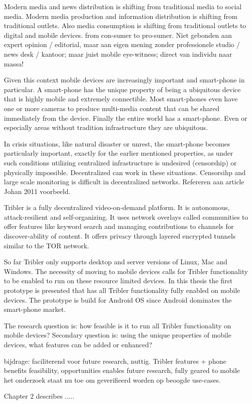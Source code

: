 Modern media and news distribution is shifting from traditional media to social media.
Modern media production and information distribution is shifting from traditional outlets.
Also media consumption is shifting from traditional outlets to digital and mobile devices.
from con-sumer to pro-sumer.
Niet gebonden aan expert opinion / editorial, maar aan eigen mening zonder professionele studio / news desk / kantoor; maar juist mobile eye-witness; direct van individu naar massa!

Given this context mobile devices are increasingly important and smart-phone in particular.
A smart-phone has the unique property of being a ubiquitous device that is highly mobile and extremely connectible.
Most smart-phones even have one or more cameras to produce multi-media content that can be shared immediately from the device.
Finally the entire world has a smart-phone.
Even or especially areas without tradition infrastructure they are ubiquitous.

In crisis situations, like natural disaster or unrest, the smart-phone becomes particularly important, exactly for the earlier mentioned properties, as under such conditions utilizing centralized infrastructure is undesired (censorship) or physically impossible.
Decentralized can work in these situations.
Censorsihp and large scale monitoring is difficult in decentralized networks.
Refereren aan article Johan 2011 voorbeeld.


Tribler is a fully decentralized video-on-demand platform.
It is autonomous, attack-resilient and self-organizing.
It uses network overlays called communities to offer features like keyword search and managing contributions to channels for discover-ability of content.
It offers privacy through layered encrypted tunnels similar to the TOR network.

So far Tribler only supports desktop and server versions of Linux, Mac and Windows.
The necessity of moving to mobile devices calls for Tribler functionality to be enabled to run on these resource limited devices.
In this thesis the first prototype is presented that has all Tribler functionality fully enabled on mobile devices.
The prototype is build for Android OS since Android dominates the smart-phone market.


The research question is: how feasible is it to run all Tribler functionality on mobile devices? %
Secondary question is: using the unique properties of mobile devices, what features can be added or enhanced?


bijdrage: faciliterend voor future research, nuttig. Tribler features + phone benefits
feasibility, opportunities enables future research, fully geared to mobile
het onderzoek staat nu toe om geverifieerd worden op beoogde use-cases.



Chapter 2 describes .....